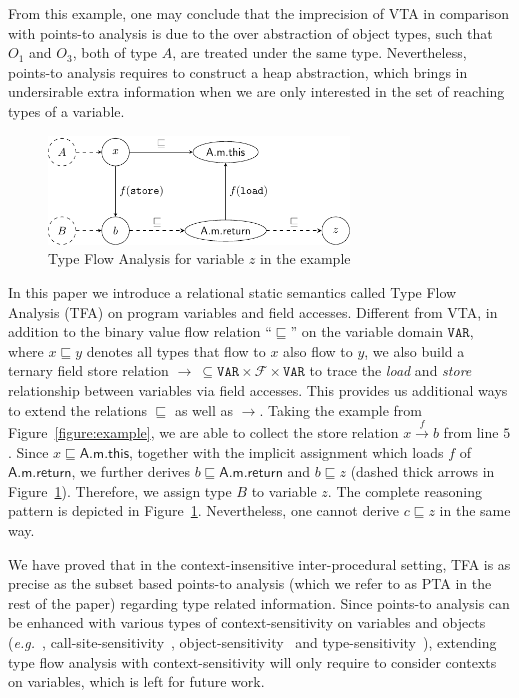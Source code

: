 \documentclass{fac}
\newcommand\eg{\textit{e.g.\ }}
\newcommand\Var{\mathtt{VAR}}
\newcommand{\Field}{\mathcal{F}}
\newcommand{\less}{\sqsubseteq}
\newcommand{\hflow}{\longrightarrow}
\newcommand{\lhflow}[1]{\stackrel{#1}{\hflow}}
\begin{document}
From this example, one may conclude that the imprecision of VTA in comparison with points-to analysis is due to the over abstraction of object types, such that $O_1$ and $O_3$, both of type $A$, are treated under the same type. Nevertheless, points-to analysis requires to construct a heap abstraction, which brings in undersirable extra information when we are only interested in the set of reaching types of a variable.

\begin{figure}
\centering
\includegraphics[width=8cm]{tfa.pdf}
\caption{Type Flow Analysis for variable $z$ in the example}\label{fig:tfa}
\end{figure}

In this paper we introduce a relational static semantics called Type Flow Analysis (TFA) on program variables and field accesses. Different from VTA, in addition to the binary value flow relation ``$\less$'' on the variable domain $\Var$, where $x\less y$ denotes all types that flow to $x$ also flow to $y$, we also build a ternary field store relation $\rightarrow\ \subseteq\Var\times\Field\times\Var$ to trace the \emph{load} and \emph{store} relationship between variables via field accesses. This provides us additional ways to extend the relations $\less$ as well as $\rightarrow$. %
Taking the example from Figure~\ref{figure:example}, we are able to collect the store relation $x\lhflow{f}b$ from line $5$. Since $x\less \textsf{A.m.this}$, together with the implicit assignment which loads $f$ of $\textsf{A.m.return}$, we further derives $b\less\textsf{A.m.return}$ and $b\less z$ (dashed thick arrows in Figure~\ref{fig:tfa}). Therefore, we assign type $B$ to variable $z$. The complete reasoning pattern is depicted in Figure~\ref{fig:tfa}. Nevertheless, one cannot derive $c\less z$ in the same way.

We have proved that in the context-insensitive inter-procedural setting, TFA is as precise as the subset based points-to analysis (which we refer to as PTA in the rest of the paper) regarding type related information. Since points-to analysis can be enhanced with various types of context-sensitivity on variables and objects (\eg, call-site-sensitivity~\cite{Shivers91,Kastrinis2013}, object-sensitivity~\cite{Milanova2005,Smaragdakis11,Tan16} and type-sensitivity~\cite{Smaragdakis11}), extending type flow analysis with context-sensitivity will only require to consider contexts on variables, which is left for future work.
\end{document}

